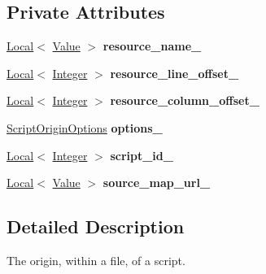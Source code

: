 \subsection*{Private Attributes}
\begin{DoxyCompactItemize}
\item 
\hyperlink{classv8_1_1_local}{Local}$<$ \hyperlink{classv8_1_1_value}{Value} $>$ {\bfseries resource\+\_\+name\+\_\+}\hypertarget{classv8_1_1_script_origin_a3b14be48fbb33dff83256b5711540ec3}{}\label{classv8_1_1_script_origin_a3b14be48fbb33dff83256b5711540ec3}

\item 
\hyperlink{classv8_1_1_local}{Local}$<$ \hyperlink{classv8_1_1_integer}{Integer} $>$ {\bfseries resource\+\_\+line\+\_\+offset\+\_\+}\hypertarget{classv8_1_1_script_origin_a5ecb48fbef9dd3d6f9abdc7bef8c13bf}{}\label{classv8_1_1_script_origin_a5ecb48fbef9dd3d6f9abdc7bef8c13bf}

\item 
\hyperlink{classv8_1_1_local}{Local}$<$ \hyperlink{classv8_1_1_integer}{Integer} $>$ {\bfseries resource\+\_\+column\+\_\+offset\+\_\+}\hypertarget{classv8_1_1_script_origin_ab65719e4f3362d5caa32a9b5ec25af83}{}\label{classv8_1_1_script_origin_ab65719e4f3362d5caa32a9b5ec25af83}

\item 
\hyperlink{classv8_1_1_script_origin_options}{Script\+Origin\+Options} {\bfseries options\+\_\+}\hypertarget{classv8_1_1_script_origin_aae98b3ae921dc48528444e29cdbed60c}{}\label{classv8_1_1_script_origin_aae98b3ae921dc48528444e29cdbed60c}

\item 
\hyperlink{classv8_1_1_local}{Local}$<$ \hyperlink{classv8_1_1_integer}{Integer} $>$ {\bfseries script\+\_\+id\+\_\+}\hypertarget{classv8_1_1_script_origin_a612429ccc195a20b29d0adc18c106a42}{}\label{classv8_1_1_script_origin_a612429ccc195a20b29d0adc18c106a42}

\item 
\hyperlink{classv8_1_1_local}{Local}$<$ \hyperlink{classv8_1_1_value}{Value} $>$ {\bfseries source\+\_\+map\+\_\+url\+\_\+}\hypertarget{classv8_1_1_script_origin_ac1cef51c37f28f78e753bfedfe2b382d}{}\label{classv8_1_1_script_origin_ac1cef51c37f28f78e753bfedfe2b382d}

\end{DoxyCompactItemize}


\subsection{Detailed Description}
The origin, within a file, of a script. 

